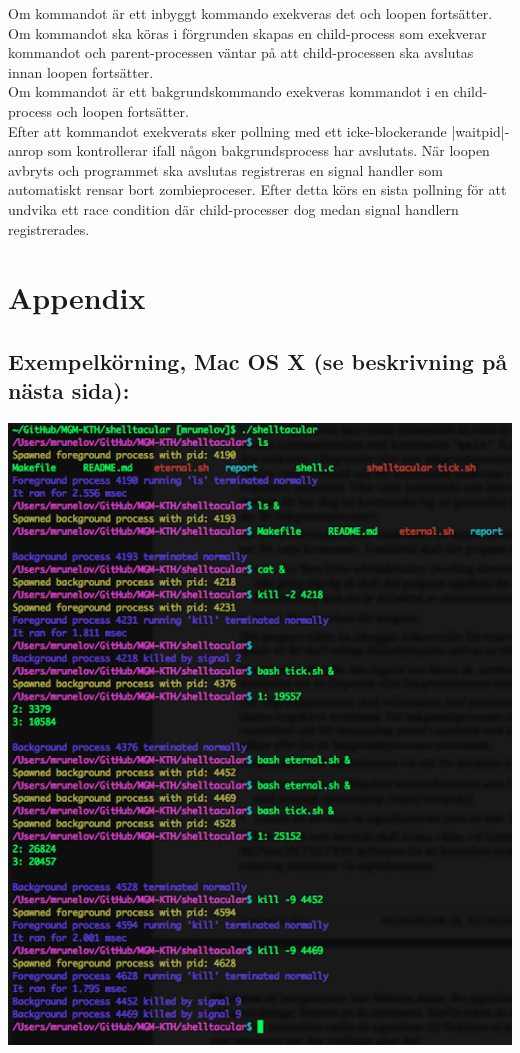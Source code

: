 \documentclass[paper=a4, fontsize=11pt]{scrartcl} %
\numberwithin{equation}{section} %
\numberwithin{figure}{section} %
\numberwithin{table}{section} %
\begin{document}
Om kommandot är ett inbyggt kommando exekveras det och loopen fortsätter.\\
Om kommandot ska köras i förgrunden skapas en child-process som exekverar kommandot
och parent-processen väntar på att child-processen ska avslutas innan loopen fortsätter.\\
Om kommandot är ett bakgrundskommando exekveras kommandot i en child-process och loopen fortsätter.\\

Efter att kommandot exekverats sker pollning med ett icke-blockerande |waitpid|-anrop som kontrollerar ifall
någon bakgrundsprocess har avslutats. När loopen avbryts och programmet ska avslutas registreras en signal handler som automatiskt rensar bort zombieproceser. Efter detta körs en sista pollning för att undvika ett race condition där child-processer dog medan signal handlern registrerades. %


\newpage
\section*{Appendix}
\subsection*{Exempelkörning, Mac OS X (se beskrivning på nästa sida):}
\centerline{\includegraphics[scale=0.9]{"test3"}}
\newpage
\end{document}
